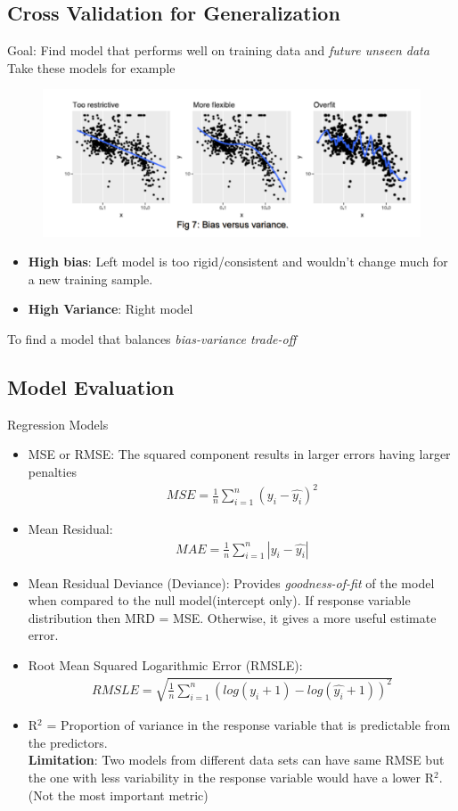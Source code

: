 \documentclass[12pt, oneside]{article}
\begin{document}
\subsection{Cross Validation for Generalization}
Goal: Find model that performs well on training data and \emph{future unseen data}
Take these models for example 
\begin{figure}[ht]
    \centering
     \includegraphics[width=1.0\textwidth]{Fig 7 Bias versus variance.png}
\end{figure}
\begin{itemize}
    \item \textbf{High bias}: Left model is too rigid/consistent and wouldn't change much for a new training sample. 
    \item \textbf{High Variance}: Right model 
\end{itemize}

To find a model that balances \emph{bias-variance trade-off}

\subsection{Model Evaluation}
Regression Models
\begin{itemize}
    \item MSE or RMSE: The squared component results in larger errors having larger penalties
    \begin{align*}
        MSE = \frac{1}{n}\sum_{i=1}^{n}(y_i - \widehat{y_i})^2
    \end{align*}
    \item Mean Residual:
    \begin{align*}
        MAE = \frac{1}{n}\sum_{i=1}^{n} |y_i - \widehat{y_i} |
    \end{align*}
    \item Mean Residual Deviance (Deviance): Provides \emph{goodness-of-fit} of the model when compared to the null model(intercept only). If response variable distribution then MRD = MSE. Otherwise, it gives a more useful estimate error.
    \item Root Mean Squared Logarithmic Error (RMSLE):
    \begin{align*}
        RMSLE = \sqrt{\frac{1}{n}\sum_{i=1}^{n}(log(y_i+1) - log(\widehat{y_i}+1))^2}
    \end{align*}
    \item R$^2$ = Proportion of variance in the response variable that is predictable from the predictors. \\
    \textbf{Limitation}: Two models from different data sets can have same RMSE but the one with less variability in the response variable would have a lower R$^2$. (Not the most important metric)
\end{itemize}
\end{document}
